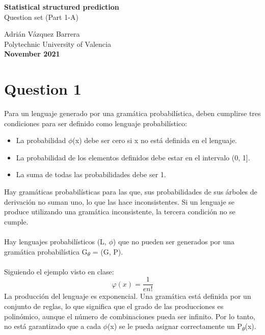 \documentclass[12pt]{article}
\begin{document}
\begin{titlepage}
    \begin{center}
        \vspace*{1cm}
         \textbf{\huge Statistical structured prediction} \\        
        \vspace{0.25cm}
         {\LARGE Question set (Part 1-A)}\\
 
        \vfill
        
        

        Adrián Vázquez Barrera \\
        \vspace{0.25cm}
        Polytechnic University of Valencia\\
        \vspace{0.25cm}
        \textbf{November 2021}
             
    \end{center}
 \end{titlepage}

\newpage

\section*{Question 1}
Para un lenguaje generado por una gramática probabilística, deben cumplirse tres condiciones para ser definido como lenguaje probabilístico:\begin{itemize}
    \item La probabilidad \( \phi \)(x) debe ser cero si x no está definida en el lenguaje.
    \item La probabilidad de los elementos definidos debe estar en el intervalo (0, 1].
    \item La suma de todas las probabilidades debe ser 1.
\end{itemize} 
Hay gramáticas probabilísticas para las que, sus probabilidades de sus árboles de derivación no suman uno, lo que las hace inconsistentes. Si un lenguaje se produce utilizando una gramática inconsistente, la tercera condición no se cumple.
\\\\
Hay lenguajes probabilísticos (L, \( \phi \)) que no pueden ser generados por una gramática probabilística G\textsubscript{\( \theta \)} = (G, P). 
\\\\
Siguiendo el ejemplo visto en clase:
    \begin{equation*}
        \varphi(x) = \frac{1}{en!}
        \end{equation*}
La producción del lenguaje es exponencial. Una gramática está definida por un conjunto de reglas, lo que significa que el grado de las producciones es polinómico, aunque el número de combinaciones pueda ser infinito. Por lo tanto, no está garantizado que a cada \( \phi \)(x) se le pueda asignar correctamente un P\textsubscript{\( \theta \)}(x).
\end{document}
